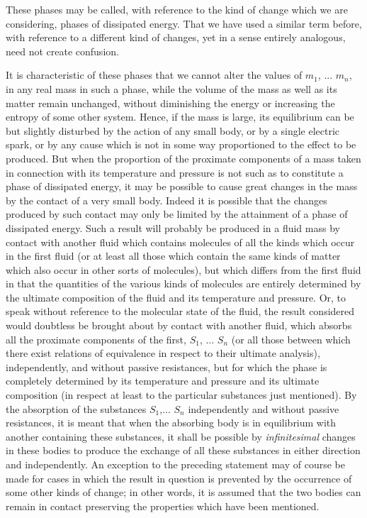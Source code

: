 \documentclass[12pt]{memoir}
\begin{document}
These phases may be called, with reference to the kind of change which we are considering, phases of dissipated energy. That we have used a similar term before, with reference to a different kind of changes, yet in a sense entirely analogous, need not create confusion.


It is characteristic of these phases that we cannot alter the values of $m_1$, ... $m_n$, in any real mass in such a phase, while the volume of the mass as well as its matter remain unchanged, without diminishing the energy or increasing the entropy of some other system. Hence, if the mass is large, its equilibrium can be but slightly disturbed
by the action of any small body, or by a single electric spark, or by any cause which is not in some way proportioned to the effect to be produced. But when the proportion of the proximate components of a mass taken in connection with its temperature and pressure is not such as to constitute a phase of dissipated energy, it may be possible to cause great changes in the mass by the contact of a very small body.
Indeed it is possible that the changes produced by such contact may only be limited by the attainment of a phase of dissipated energy. Such a result will probably be produced in a fluid mass by contact with another fluid which contains molecules of all the kinds which occur in the first fluid (or at least all those which contain the same kinds of matter which also occur in other sorts of molecules), but which differs from the first fluid in that the quantities of the various kinds of molecules are entirely determined by the ultimate composition of the fluid and its temperature and pressure. Or, to speak without reference to the molecular state of the fluid, the result considered would doubtless be brought about by contact with another fluid, which absorbs all the proximate components of the first, $S_1$, ... $S_n$  (or all those between which there exist relations of equivalence in respect to their ultimate analysis), independently, and without passive resistances, but for which the phase is completely determined by its temperature and pressure and its ultimate composition (in respect at least to the particular substances just mentioned). By the absorption of the substances $S_1$,... $S_n$ independently and without passive resistances, it is meant that when the absorbing body is in equilibrium with another containing these substances, it shall be possible by \textit{infinitesimal} changes in these bodies to produce the exchange of all these substances in either direction and independently. An exception to the preceding statement may of course be made for cases in which the result in question is prevented by the occurrence of some other kinds of change; in other words, it is assumed that the two bodies can remain in contact preserving the properties which have been mentioned.
\end{document}
